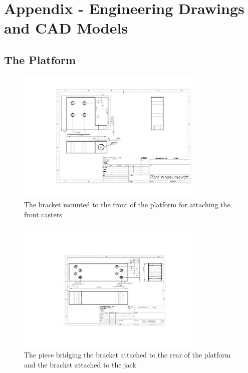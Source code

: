 \chapter{Appendix - Engineering Drawings and CAD Models}
\label{appendix:Appendix_eng}

\section{The Platform}

\begin{figure}
\centering
 \includegraphics[width=0.8\textwidth]{images/Front_Wheel_mount}
\caption{The bracket mounted to the front of the platform for attaching the front casters}
\label{fig:front_bracket}
\end{figure}

\begin{figure}
\centering
 \includegraphics[width=0.8\textwidth]{images/Tall_Piece}
\caption{The piece bridging the bracket attached to the rear of the platform and the bracket attached to the jack}
\label{fig:tall_piece}
\end{figure}

